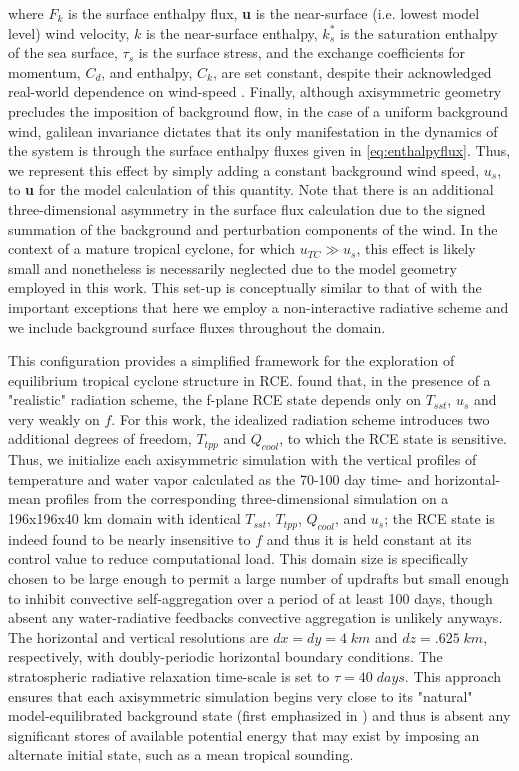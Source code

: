 \documentclass[12pt]{article}
\begin{document}
where $F_k$ is the surface enthalpy flux, {\bf u} is the near-surface (i.e. lowest model level) wind velocity, $k$ is the near-surface enthalpy, $k^*_s$ is the saturation enthalpy of the sea surface, $\tau_s$ is the surface stress, and the exchange coefficients for momentum, $C_d$, and enthalpy, $C_k$, are set constant, despite their acknowledged real-world dependence on wind-speed \citep{Powell_Vickery_Reinhold_2003}. Finally, although axisymmetric geometry precludes the imposition of background flow, in the case of a uniform background wind, galilean invariance dictates that its only manifestation in the dynamics of the system is through the surface enthalpy fluxes given in \eqref{eq:enthalpyflux}.  Thus, we represent this effect by simply adding a constant background wind speed, $u_s$, to {\bf u} for the model calculation of this quantity.  Note that there is an additional three-dimensional asymmetry in the surface flux calculation due to the signed summation of the background and perturbation components of the wind.  In the context of a mature tropical cyclone, for which $u_{TC} \gg u_s$, this effect is likely small and nonetheless is necessarily neglected due to the model geometry employed in this work.  This set-up is conceptually similar to that of \cite{Hakim_2011} with the important exceptions that here we employ a non-interactive radiative scheme and we include background surface fluxes throughout the domain.

This configuration provides a simplified framework for the exploration of equilibrium tropical cyclone structure in RCE. \cite{Nolan_Rappin_Emanuel_2007} found that, in the presence of a "realistic" radiation scheme, the f-plane RCE state depends only on $T_{sst}$, $u_s$ and very weakly on $f$. For this work, the idealized radiation scheme introduces two additional degrees of freedom, $T_{tpp}$ and $Q_{cool}$, to which the RCE state is sensitive. Thus, we initialize each axisymmetric simulation with the vertical profiles of temperature and water vapor calculated as the 70-100 day time- and horizontal-mean profiles from the corresponding three-dimensional simulation on a 196x196x40 km domain with identical $T_{sst}$, $T_{tpp}$, $Q_{cool}$, and $u_s$; the RCE state is indeed found to be nearly insensitive to $f$ and thus it is held constant at its control value to reduce computational load. This domain size is specifically chosen to be large enough to permit a large number of updrafts but small enough to inhibit convective self-aggregation \citep{Bretherton_Blossey_Khairoutdinov_2005} over a period of at least 100 days, though absent any water-radiative feedbacks convective aggregation is unlikely anyways. The horizontal and vertical resolutions are $dx = dy = 4 \; km$ and $dz = .625 \; km$, respectively, with doubly-periodic horizontal boundary conditions.  The stratospheric radiative relaxation time-scale is set to $\tau = 40 \; days$. This approach ensures that each axisymmetric simulation begins very close to its "natural" model-equilibrated background state (first emphasized in \cite{Rotunno_Emanuel_1987}) and thus is absent any significant stores of available potential energy that may exist by imposing an alternate initial state, such as a mean tropical sounding.
\end{document}
